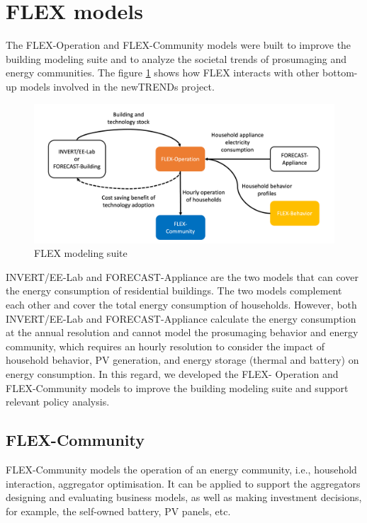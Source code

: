 \section{FLEX models}

The FLEX-Operation and FLEX-Community models were built to improve the building modeling suite and to analyze the societal trends of prosumaging and energy communities.
The figure \ref{fig:flex} shows how FLEX interacts with other bottom-up models involved in the newTRENDs project.

\begin{figure}[h]
  \centering
  \includegraphics[width=\textwidth]{Images/flex.png}
  \caption{FLEX modeling suite}
  \label{fig:flex}
\end{figure}

INVERT/EE-Lab and FORECAST-Appliance are the two models that can cover the energy consumption of residential buildings. The two models complement each other and cover the total energy consumption of households. 
However, both INVERT/EE-Lab and FORECAST-Appliance calculate the energy consumption at the annual resolution and cannot model the prosumaging behavior and energy community, which requires an hourly resolution to consider the impact of household behavior, PV generation, and energy storage (thermal and battery) on energy consumption. In this regard, we developed the FLEX- Operation and FLEX-Community models to improve the building modeling suite and support relevant policy analysis.

\subsection{FLEX-Community}

FLEX-Community models the operation of an energy community, i.e., household interaction, aggregator optimisation. 
It can be applied to support the aggregators designing and evaluating business models, as well as making investment decisions, for example, the self-owned battery, PV panels, etc.

